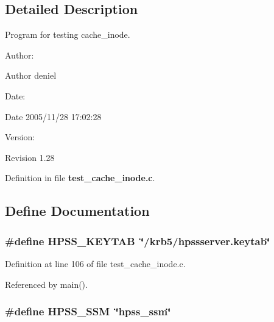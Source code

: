 \subsection{Detailed Description}
Program for testing cache\_\-inode. 

\begin{Desc}
\item[Author:]\begin{Desc}
\item[Author]deniel \end{Desc}
\end{Desc}
\begin{Desc}
\item[Date:]\begin{Desc}
\item[Date]2005/11/28 17:02:28 \end{Desc}
\end{Desc}
\begin{Desc}
\item[Version:]\begin{Desc}
\item[Revision]1.28 \end{Desc}
\end{Desc}


Definition in file {\bf test\_\-cache\_\-inode.c}.

\subsection{Define Documentation}
\subsubsection{\setlength{\rightskip}{0pt plus 5cm}\#define HPSS\_\-KEYTAB\ \char`\"{}/krb5/hpssserver.keytab\char`\"{}}\label{test__cache__inode_8c_a1}




Definition at line 106 of file test\_\-cache\_\-inode.c.

Referenced by main().
\subsubsection{\setlength{\rightskip}{0pt plus 5cm}\#define HPSS\_\-SSM\ \char`\"{}hpss\_\-ssm\char`\"{}}\label{test__cache__inode_8c_a0}




